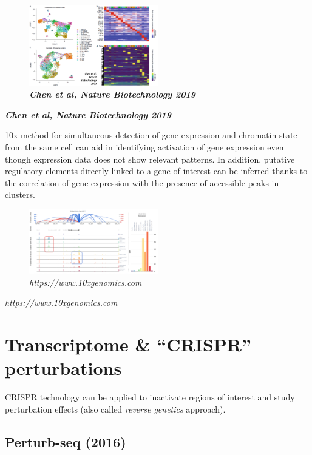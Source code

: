 \begin{figure}
\centering
\includegraphics[width=0.5\textwidth]{images/Screenshot_10.png}
\caption{\textbf{\emph{Chen et al, Nature Biotechnology 2019}}}
\end{figure}

\textbf{\emph{Chen et al, Nature Biotechnology 2019}}

10x method for simultaneous detection of gene expression and chromatin
state from the same cell can aid in identifying activation of gene
expression even though expression data does not show relevant patterns.
In addition, putative regulatory elements directly linked to a gene of
interest can be inferred thanks to the correlation of gene expression
with the presence of accessible peaks in clusters.

\begin{figure}
\centering
\includegraphics[width=0.5\textwidth]{images/Screenshot_11.png}
\caption{\emph{https://www.10xgenomics.com}}
\end{figure}

\emph{https://www.10xgenomics.com}

\hypertarget{transcriptome-crispr-perturbations}{%
\section{Transcriptome \& ``CRISPR''
perturbations}\label{transcriptome-crispr-perturbations}}

CRISPR technology can be applied to inactivate regions of interest and
study perturbation effects (also called \emph{reverse genetics}
approach).

\hypertarget{perturb-seq-2016}{%
\subsection{Perturb-seq (2016)}\label{perturb-seq-2016}}

